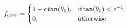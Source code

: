 \documentclass[12pt]{article}
\begin{document}
\begin{equation}
	f_{corr} = \begin{cases}
		1 - \epsilon \hspace{0.5mm} tan(\theta_{0}), & \text{if} \tan(\theta_{0}) < \epsilon^{-1} \\
		0, & \text{otherwise}
	\end{cases}
\end{equation}
\end{document}
